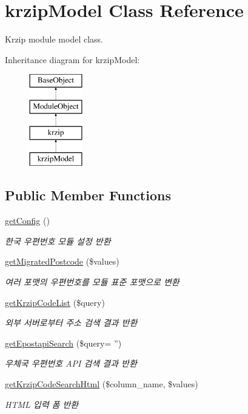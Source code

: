 \hypertarget{classkrzipModel}{\section{krzip\-Model Class Reference}
\label{classkrzipModel}
}


Krzip module model class.  


Inheritance diagram for krzip\-Model\-:\begin{figure}[H]
\begin{center}
\leavevmode
\includegraphics[height=4.000000cm]{classkrzipModel}
\end{center}
\end{figure}
\subsection*{Public Member Functions}
\begin{DoxyCompactItemize}
\item 
\hyperlink{classkrzipModel_aaa67f6f01ab9e1aa5669e72d09e226f6}{get\-Config} ()
\begin{DoxyCompactList}\small\item\em 한국 우편번호 모듈 설정 반환 \end{DoxyCompactList}\item 
\hyperlink{classkrzipModel_ae9354004fb46bf08a4aca8804d673a1f}{get\-Migrated\-Postcode} (\$values)
\begin{DoxyCompactList}\small\item\em 여러 포맷의 우편번호를 모듈 표준 포맷으로 변환 \end{DoxyCompactList}\item 
\hyperlink{classkrzipModel_ab2f9d00c14d4e20656d8becc96fd372a}{get\-Krzip\-Code\-List} (\$query)
\begin{DoxyCompactList}\small\item\em 외부 서버로부터 주소 검색 결과 반환 \end{DoxyCompactList}\item 
\hyperlink{classkrzipModel_afb582a09da409c25522376276acdebbd}{get\-Epostapi\-Search} (\$query= '')
\begin{DoxyCompactList}\small\item\em 우체국 우편번호 A\-P\-I 검색 결과 반환 \end{DoxyCompactList}\item 
\hyperlink{classkrzipModel_ae56ba8c6c1a46bb366e8a02692bd53ba}{get\-Krzip\-Code\-Search\-Html} (\$column\-\_\-name, \$values)
\begin{DoxyCompactList}\small\item\em H\-T\-M\-L 입력 폼 반환 \end{DoxyCompactList}\end{DoxyCompactItemize}
